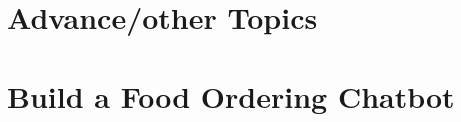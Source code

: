 % 

% 

% 
% 

% 
% 

% 
% 



% 

% 

\section[Adv]{Advance/other Topics}
% 
% 



\section[Exercise]{Build a Food Ordering Chatbot}


% 
% 